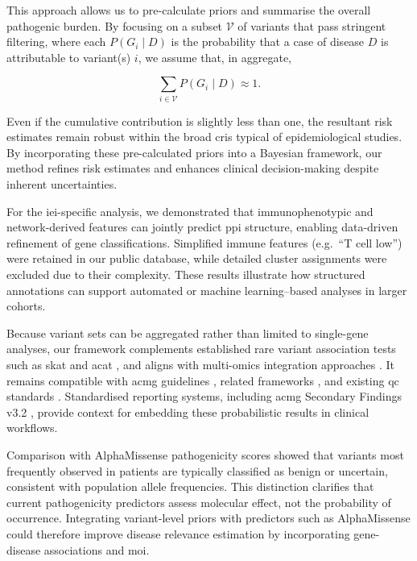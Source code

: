 This approach allows us to pre-calculate priors and summarise the overall pathogenic burden.
By focusing on a subset \(\mathcal{V}\) of variants that pass stringent filtering, where each \(P(G_i \mid D)\) is the probability that a case of disease \(D\) is attributable to variant(s) \(i\), we assume that, in aggregate,

\[
\sum_{i\in\mathcal{V}} P(G_i\mid D) \approx 1.
\]

Even if the cumulative contribution is slightly less than one, the resultant risk estimates remain robust within the broad \ac{cri}s typical of epidemiological studies. 
By incorporating these pre-calculated priors into a Bayesian framework, our method refines risk estimates and enhances clinical decision-making despite inherent uncertainties.

For the \ac{iei}-specific analysis, we demonstrated that immunophenotypic and network-derived features can jointly predict \ac{ppi} structure, enabling data-driven refinement of gene classifications. Simplified immune features (e.g.\ “T cell low”) were retained in our public database, while detailed cluster assignments were excluded due to their complexity. These results illustrate how structured annotations can support automated or machine learning–based analyses in larger cohorts.  

Because variant sets can be aggregated rather than limited to single-gene analyses, our framework complements established rare variant association tests such as \ac{skat} and \ac{acat} \cite{liu2019acat,li2020dynamic,wu2011rare,lee2012optimal}, and aligns with multi-omics integration approaches \cite{kong2018nature,howe2021within}. It remains compatible with \ac{acmg} guidelines \cite{richards2015standards}, related frameworks \cite{tavtigian2020fitting,li2017intervar}, and existing \ac{qc} standards \cite{pedersen2021effective,anderson2010data}. Standardised reporting systems, including \ac{acmg} Secondary Findings v3.2 \cite{miller2023acmg}, provide context for embedding these probabilistic results in clinical workflows.  

Comparison with AlphaMissense pathogenicity scores showed that variants most frequently observed in patients are typically classified as benign or uncertain, consistent with population allele frequencies. This distinction clarifies that current pathogenicity predictors assess molecular effect, not the probability of occurrence. Integrating variant-level priors with predictors such as AlphaMissense could therefore improve disease relevance estimation by incorporating gene-disease associations and \ac{moi}.  

